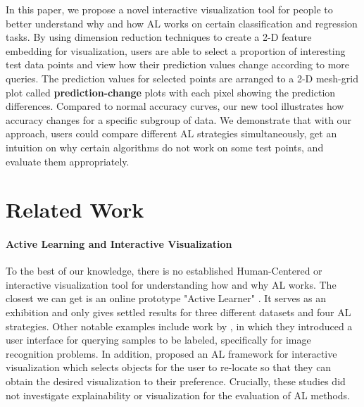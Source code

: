 \documentclass{article}
\begin{document}
In this paper, we propose a novel interactive visualization tool for people to better understand why and how AL works on certain classification and regression tasks. By using dimension reduction techniques to create a 2-D feature embedding for visualization, users are able to select a proportion of interesting test data points and view how their prediction values change according to more queries. The prediction values for selected points are arranged to a 2-D mesh-grid plot called \textbf{prediction-change} plots with each pixel showing the prediction differences. Compared to normal accuracy curves, our new tool illustrates how accuracy changes for a specific subgroup of data. We demonstrate that with our approach, users could compare different AL strategies simultaneously, get an intuition on why certain algorithms do not work on some test points, and evaluate them appropriately. 

 


\section{Related Work}

\paragraph{Active Learning and Interactive Visualization}
To the best of our knowledge, there is no established Human-Centered or interactive visualization tool for understanding how and why AL works. The closest we can get is an online prototype "Active Learner" \citep{cloudera}. It serves as an exhibition and only gives settled results for three different datasets and four AL strategies. Other notable examples include work by \citet{inbook}, in which they introduced a user interface for querying samples to be labeled, specifically for image recognition problems. In addition, \citet{Iwata2013ActiveLF} proposed an AL framework for interactive visualization which selects objects for the user to re-locate so that they can obtain the desired visualization to their preference. Crucially, these studies did not investigate explainability or visualization for the evaluation of AL methods.
\end{document}
